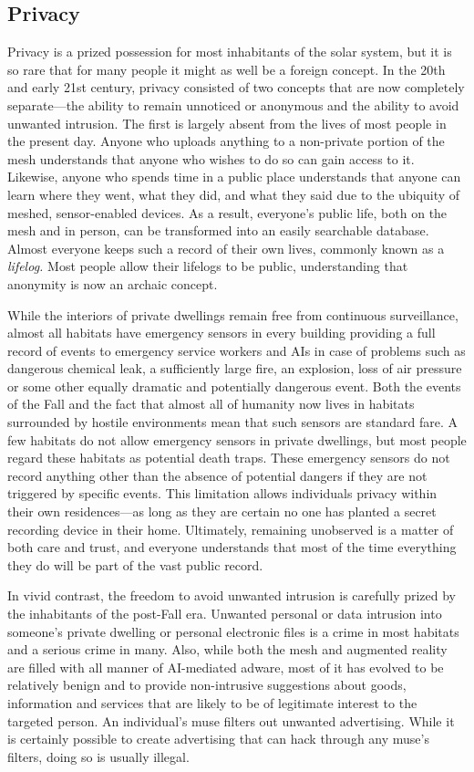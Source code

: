 \subsection{Privacy}

Privacy is a prized possession for most inhabitants of 
the solar system, but it is so rare that for many people 
it might as well be a foreign concept. In the 20th and 
early 21st century, privacy consisted of two concepts 
that are now completely separate—the ability to remain 
unnoticed or anonymous and the ability to avoid unwanted
intrusion. The first is largely absent from the
lives of most people in the present day. Anyone who 
uploads anything to a non-private portion of the mesh 
understands that anyone who wishes to do so can gain 
access to it. Likewise, anyone who spends time in a 
public place understands that anyone can learn where 
they went, what they did, and what they said due to the 
ubiquity of meshed, sensor-enabled devices. As a result, 
everyone's public life, both on the mesh and in person, 
can be transformed into an easily searchable database. 
Almost everyone keeps such a record of their own lives, 
commonly known as a \textit{lifelog.} Most people allow their 
lifelogs to be public, understanding that anonymity is 
now an archaic concept.

While the interiors of private dwellings remain free 
from continuous surveillance, almost all habitats have 
emergency sensors in every building providing a full 
record of events to emergency service workers and AIs 
in case of problems such as dangerous chemical leak, 
a sufficiently large fire, an explosion, loss of air pressure
or some other equally dramatic and potentially
dangerous event. Both the events of the Fall and the 
fact that almost all of humanity now lives in habitats 
surrounded by hostile environments mean that such 
sensors are standard fare. A few habitats do not allow 
emergency sensors in private dwellings, but most 
people regard these habitats as potential death traps. 
These emergency sensors do not record anything other 
than the absence of potential dangers if they are not 
triggered by specific events. This limitation allows 
individuals privacy within their own residences—as 
long as they are certain no one has planted a secret 
recording device in their home. Ultimately, remaining 
unobserved is a matter of both care and trust, and everyone
understands that most of the time everything
they do will be part of the vast public record.

In vivid contrast, the freedom to avoid unwanted 
intrusion is carefully prized by the inhabitants of the 
post-Fall era. Unwanted personal or data intrusion 
into someone's private dwelling or personal electronic 
files is a crime in most habitats and a serious crime in 
many. Also, while both the mesh and augmented reality
are filled with all manner of AI-mediated adware,
most of it has evolved to be relatively benign and to 
provide non-intrusive suggestions about goods, information
and services that are likely to be of legitimate
interest to the targeted person. An individual's muse 
filters out unwanted advertising. While it is certainly 
possible to create advertising that can hack through 
any muse's filters, doing so is usually illegal.

